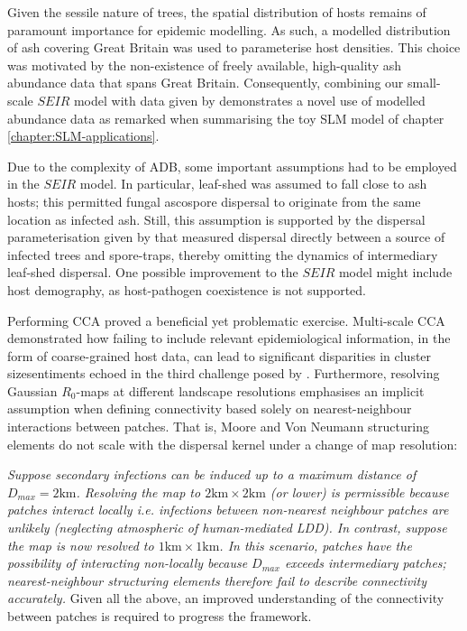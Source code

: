 Given the sessile nature of trees, the spatial distribution of hosts remains of paramount importance for epidemic modelling.
As such, a modelled distribution of ash covering Great Britain was used to parameterise host densities.
This choice was motivated by the non-existence of freely available, high-quality ash abundance data that spans Great Britain.
Consequently, combining our small-scale $SEIR$ model with data given by \cite{hill.data} demonstrates a novel use of modelled abundance data\textemdash
as remarked when summarising the toy SLM model of chapter \ref{chapter:SLM-applications}.

Due to the complexity of ADB, some important assumptions had to be employed in the $SEIR$ model.
In particular, leaf-shed was assumed to fall close to ash hosts; 
this permitted fungal ascospore dispersal to originate from the same location as infected ash.
Still, this assumption is supported by the dispersal parameterisation given by \cite{grosdidier2018tracking} that measured dispersal directly between a source of infected trees and spore-traps, thereby omitting the dynamics of intermediary leaf-shed dispersal.
One possible improvement to the $SEIR$ model might include host demography, as host-pathogen coexistence is not supported.

Performing CCA proved a beneficial yet problematic exercise.
Multi-scale CCA demonstrated how failing to include relevant epidemiological information, in the form of coarse-grained host data, can lead to significant disparities in cluster size\textemdash sentiments echoed in the third challenge posed by \cite{13-challenges}.
Furthermore, resolving Gaussian $R_0$-maps at different landscape resolutions emphasises an implicit assumption when defining connectivity based solely on nearest-neighbour interactions between patches. 
That is, Moore and Von Neumann structuring elements do not scale with the dispersal kernel under a change of map resolution:

\textit{Suppose secondary infections can be induced up to a maximum distance of $D_{max} = 2\mathrm{km}$.
Resolving the map to $\mathrm{2km \times 2km}$ (or lower) is permissible because patches interact locally i.e. infections between non-nearest neighbour patches are unlikely (neglecting atmospheric of human-mediated LDD).
In contrast, suppose the map is now resolved to $\mathrm{1km \times 1km}$.
In this scenario, patches have the possibility of interacting non-locally because $D_{max}$ exceeds intermediary patches;
nearest-neighbour structuring elements therefore fail to describe connectivity accurately.}
Given all the above, an improved understanding of the connectivity between patches is required to progress the framework.

